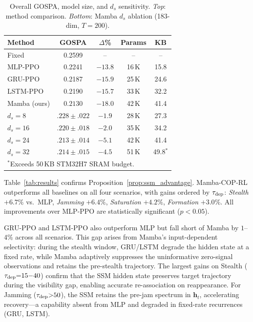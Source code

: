 \documentclass[journal]{IEEEtran}
\def\vec#1{\mathbf{#1}}
\begin{document}
\begin{table}[t]
  \centering
  \caption{Overall GOSPA, model size, and $d_s$ sensitivity.
           \emph{Top}: method comparison.
           \emph{Bottom}: Mamba $d_s$ ablation (183-dim, $T{=}200$).}
  \label{tab:overall}
  \footnotesize
  \setlength{\tabcolsep}{4.5pt}
  \begin{tabular}{lcccc}
    \toprule
    Method & GOSPA & $\Delta$\% & Params & KB \\
    \midrule
    Fixed        & 0.2599 & --      & --    & --   \\
    MLP-PPO      & 0.2241 & $-13.8$ & 16\,K & 15.8 \\
    GRU-PPO      & 0.2187 & $-15.9$ & 25\,K & 24.6 \\
    LSTM-PPO     & 0.2190 & $-15.7$ & 33\,K & 32.2 \\
    Mamba (ours) & $\mathbf{0.2130}$ & $\mathbf{-18.0}$ & 42\,K & 41.4 \\
    \midrule
    $d_s{=}8$  & $.228{\pm}.022$ & $-1.9$ & 28\,K & 27.3 \\
    $d_s{=}16$ & $.220{\pm}.018$ & $-2.0$ & 35\,K & 34.2 \\
    $d_s{=}24$ & $\mathbf{.213}{\pm}.014$ & $\mathbf{-5.1}$ & 42\,K & 41.4 \\
    $d_s{=}32$ & $.214{\pm}.015$ & $-4.5$ & 51\,K & 49.8$^*$ \\
    \bottomrule
    \multicolumn{5}{l}{\scriptsize $^*$Exceeds 50\,KB STM32H7 SRAM budget.}
  \end{tabular}
\end{table}

Table~\ref{tab:results} confirms Proposition~\ref{prop:ssm_advantage}.
Mamba-COP-RL outperforms all baselines on all four scenarios,
with gains ordered by $\tau_{\rm dep}$:
\emph{Stealth} $+6.7\%$ vs.\ MLP, \emph{Jamming} $+6.4\%$,
\emph{Saturation} $+4.2\%$, \emph{Formation} $+3.0\%$.
All improvements over MLP-PPO are statistically significant ($p{<}0.05$).

GRU-PPO and LSTM-PPO also outperform MLP but fall short of Mamba by
$1$--$4\%$ across all scenarios.
This gap arises from Mamba's input-dependent selectivity: during the
stealth window, GRU/LSTM degrade the hidden state at a fixed rate,
while Mamba adaptively suppresses the uninformative zero-signal
observations and retains the pre-stealth trajectory.
The largest gains on Stealth ($\tau_{\rm dep}{=}15{-}40$) confirm
that the SSM hidden state preserves target trajectory during the
visibility gap, enabling accurate re-association on reappearance.
For Jamming ($\tau_{\rm dep}{>}50$), the SSM retains the pre-jam
spectrum in $\vec{h}_t$, accelerating recovery---a capability
absent from MLP and degraded in fixed-rate recurrences (GRU, LSTM).
\end{document}
